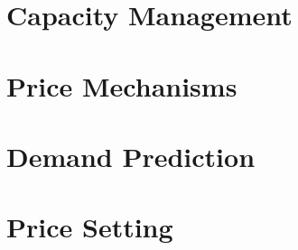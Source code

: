 \section{Capacity Management}

\section{Price Mechanisms}

\section{Demand Prediction}

\section{Price Setting}
